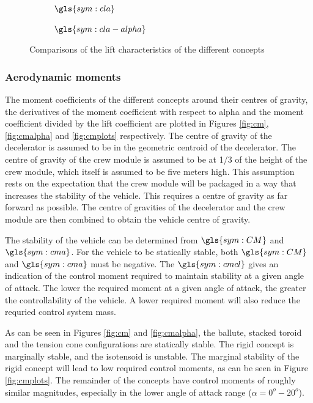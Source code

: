 \begin{figure}[h]
	\centering
	\begin{subfigure}[b]{0.49\textwidth}
		\setlength{} 
		\setlength{}
		
		\caption{$\gls{sym:cla}$}
		\label{fig:cl}
	\end{subfigure}
	\begin{subfigure}[b]{0.49\textwidth}
		\setlength{} 
		\setlength{}
		
		\caption{$\gls{sym:cla-alpha}$}
		\label{fig:claplha}
	\end{subfigure}
	\caption{Comparisons of the lift characteristics of the different concepts}
	\label{fig:clplots}
\end{figure}

\subsubsection{Aerodynamic moments}
The moment coefficients of the different concepts around their centres of gravity, the derivatives of the moment coefficient with respect to alpha and the moment coefficient divided by the lift coefficient are plotted in Figures \ref{fig:cm}, \ref{fig:cmalpha} and \ref{fig:cmplots} respectively. The centre of gravity of the decelerator is assumed to be in the geometric centroid of the decelerator. The centre of gravity of the crew module is assumed to be at 1/3 of the height of the crew module, which itself is assumed to be five meters high. This assumption rests on the expectation that the crew module will be packaged in a way that increases the stability of the vehicle. This requires a centre of gravity as far forward as possible. The centre of gravities of the decelerator and the crew module are then combined to obtain the vehicle centre of gravity. 

The stability of the vehicle can be determined from $\gls{sym:CM}$ and $\gls{sym:cma}$. For the vehicle to be statically stable, both $\gls{sym:CM}$ and $\gls{sym:cma}$ must be negative. The $\gls{sym:cmcl}$ gives an indication of the control moment required to maintain stability at a given angle of attack. The lower the required moment at a given angle of attack, the greater the controllability of the vehicle. A lower required moment will also reduce the requried control system mass. 
 
As can be seen in Figures \ref{fig:cm} and \ref{fig:cmalpha}, the ballute, stacked toroid and the tension cone configurations are statically stable. The rigid concept is marginally stable, and the isotensoid is unstable. The marginal stability of the rigid concept will lead to low required control moments, as can be seen in Figure \ref{fig:cmplots}. The remainder of the concepts have control moments of roughly similar magnitudes, especially in the lower angle of attack range ($\alpha = 0^{o}-20^{o}$).  
 
